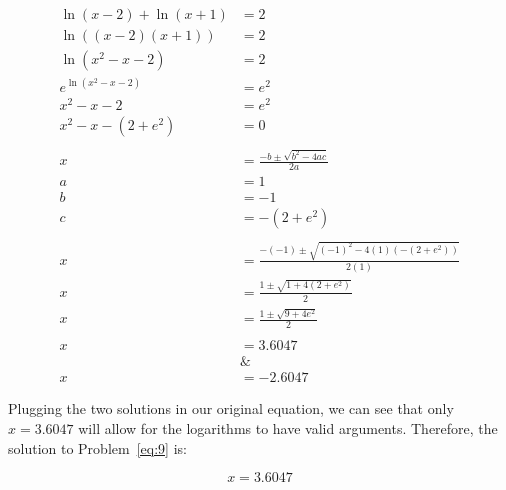 \documentclass[12pt]{article}
\theoremstyle{definition}
\begin{document}
\begin{align}
    \ln(x-2) + \ln(x+1) & = 2                                                 \\
    \ln((x-2)(x+1))     & = 2                                                 \\
    \ln(x^2-x-2)        & = 2                                                 \\
    e^{\ln(x^2-x-2)}    & = e^2                                               \\
    x^2-x-2             & = e^2                                               \\
    x^2-x-(2+e^2)       & = 0                                                 \\
    \nonumber                                                                 \\
    x                   & = \frac{-b\pm\sqrt{b^2-4ac}}{2a}                    \\
    a                   & = 1                                                 \\
    b                   & = -1                                                \\
    c                   & = -(2+e^2)                                          \\
    \nonumber                                                                 \\
    x                   & = \frac{-(-1)\pm\sqrt{(-1)^2-4(1)(-(2+e^2))}}{2(1)} \\
    x                   & = \frac{1\pm\sqrt{1+4(2+e^2)}}{2}                   \\
    x                   & = \frac{1\pm\sqrt{9+4e^2}}{2}                       \\
    \nonumber                                                                 \\
    x                   & = 3.6047                                            \\
                        & \&                                                  \\
    x                   & = - 2.6047
\end{align}

Plugging the two solutions in our original equation, we can see that only $x = 3.6047$ will allow for the logarithms to have valid arguments.
Therefore, the solution to Problem~\eqref{eq:9} is:

\begin{equation}
    x = 3.6047
\end{equation}
\end{document}
